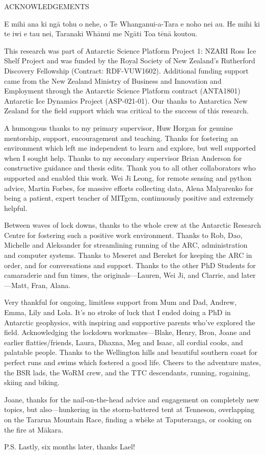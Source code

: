 \newpage
{}

\begin{center}
ACKNOWLEDGEMENTS
\end{center}

E mihi ana ki ng\=a tohu o nehe, o Te Whanganui-a-Tara e noho nei au.
He mihi ki te iwi e tau nei, Taranaki Wh\=anui me Ng\=ati Toa t\=en\=a koutou.

This research was part of Antarctic Science Platform Project 1: NZARI Ross Ice Shelf Project and was funded by the Royal Society of New Zealand’s Rutherford Discovery Fellowship (Contract: RDF-VUW1602). 
Additional funding support came from the New Zealand Ministry of Business and Innovation and Employment through the Antarctic Science Platform contract (ANTA1801) Antarctic Ice Dynamics Project (ASP-021-01). 
Our thanks to Antarctica New Zealand for the field support which was critical to the success of this research. 

A humongous thanks to my primary supervisor, Huw Horgan for genuine mentorship, support, encouragement and teaching. Thanks for fostering an environment which left me independent to learn and explore, but well supported when I sought help. Thanks to my secondary supervisor Brian Anderson for constructive guidance and thesis edits. 
Thank you to all other collaborators who supported and enabled this work. Wei Ji Leong, for remote sensing and python advice, Martin Forbes, for massive efforts collecting data, Alena Malyarenko for being a patient, expert teacher of MITgcm, continuously positive and extremely helpful.

Between waves of lock downs, thanks to the whole crew at the Antarctic Research Centre for fostering such a positive work environment. Thanks to Rob, Dao, Michelle and Aleksander for streamlining running of the ARC, administration and computer systems. Thanks to Meseret and Bereket for keeping the ARC in order, and for conversations and support. Thanks to the other PhD Students for camaraderie and fun times, the originals---Lauren, Wei Ji, and Clarrie, and later---Matt, Fran, Alana. 

Very thankful for ongoing, limitless support from Mum and Dad, Andrew, Emma, Lily and Lola.  It's no stroke of luck that I ended doing a PhD in Antarctic geophysics, with inspiring and supportive parents who've explored the field. Acknowledging the lockdown workmates---Blake, Henry, Bron, Joane and earlier flatties/friends, Laura, Dhaxna, Meg and Isaac, all cordial cooks, and palatable people.   
Thanks to the Wellington hills and beautiful southern coast for perfect runs and swims which fostered a good life. Cheers to the adventure mates, the BSR lads, the WoRM crew, and the TTC descendants, running, rogaining, skiing and biking.

Joane, thanks for the nail-on-the-head advice and engagement on completely new topics, but also---hunkering in the storm-battered tent at Tenneson, overlapping on the Tararua Mountain Race, finding a wh\=eke at Taputeranga, or cooking on the fire at M\=akara.

P.S. Lastly, six months later, thanks Lael!